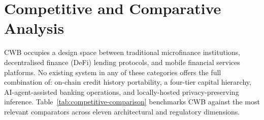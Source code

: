 \section{Competitive and Comparative Analysis}
\label{sec:competitive-analysis}

CWB occupies a design space between traditional microfinance institutions,
decentralised finance (DeFi) lending protocols, and mobile financial services
platforms. No existing system in any of these categories offers the full
combination of: on-chain credit history portability, a four-tier capital
hierarchy, AI-agent-assisted banking operations, and locally-hosted
privacy-preserving inference. Table~\ref{tab:competitive-comparison}
benchmarks CWB against the most relevant comparators across eleven
architectural and regulatory dimensions.

